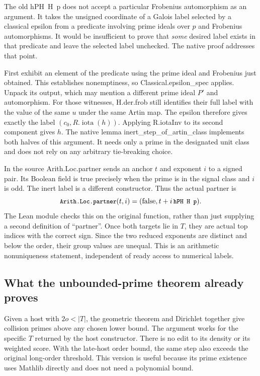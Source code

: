 \documentclass[12pt,letterpaper]{article}
\DeclareRobustCommand{\id}[1]{\mbox{\small\ttfamily #1}}
\begin{document}
The old \id{hPH H p} does not accept a particular Frobenius automorphism as an argument. It takes the unsigned coordinate of a Galois label selected by a classical epsilon from a predicate involving prime ideals over \(p\) and Frobenius automorphisms. It would be insufficient to prove that \emph{some} desired label exists in that predicate and leave the selected label unchecked. The native proof addresses that point.

First exhibit an element of the predicate using the prime ideal and Frobenius just obtained. This establishes nonemptiness, so \id{Classical.epsilon\_spec} applies. Unpack its output, which may mention a different prime ideal \(P'\) and automorphism. For those witnesses, \id{H.der.frob} still identifies their full label with the value of the same \(u\) under the same Artin map. The epsilon therefore gives exactly the label \((c_0,R.\operatorname{iota}(h))\). Applying \id{R.iotaInv} to its second component gives \(h\). The native lemma \id{inert\_step\_of\_artin\_class} implements both halves of this argument. It needs only a prime in the designated unit class and does not rely on any arbitrary tie-breaking choice.

In the source \id{Arith.Loc.partner} sends an anchor \(t\) and exponent \(i\) to a signed pair. Its Boolean field is true precisely when the prime is in the signal class and \(i\) is odd. The inert label is a different constructor. Thus the actual partner is
\[
        \id{Arith.Loc.partner}(t,i)=(\mathrm{false},t+i\,\id{hPH H p}).
\]
The Lean module checks this on the original function, rather than just supplying a second definition of “partner”. Once both targets lie in \(T\), they are actual top indices with the correct sign. Since the two reduced exponents are distinct and below the order, their group values are unequal. This is an arithmetic nonuniqueness statement, independent of ready access to numerical labels.

\subsection{What the unbounded-prime theorem already proves}

Given a host with \(2o<|T|\), the geometric theorem and Dirichlet together give collision primes above any chosen lower bound. The argument works for the specific \(T\) returned by the host constructor. There is no edit to its density or its weighted score. With the late-host order bound, the same step also exceeds the original long-order threshold. This version is useful because its prime existence uses Mathlib directly and does not need a polynomial bound.
\end{document}
